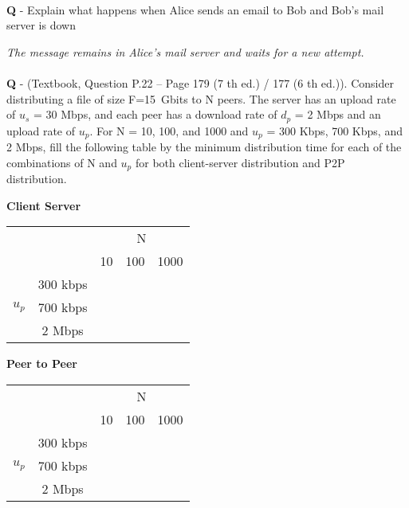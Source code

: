 \documentclass{llncs}
\newcounter{ques}
\newcommand{\quest}[2]{\paragraph{}\textbf{Q\theques} - #1\stepcounter{ques} }
\newcommand{\answer}[1]{\color{red}\textit{#1}\color{black}}
\begin{document}
\quest{Explain what happens when Alice sends an email to Bob and Bob's
  mail server is down}{10}

\answer{The message remains in Alice's mail server and waits for a new attempt.}

\quest{(Textbook, Question P.22 – Page 179 (7 th ed.) / 177 (6 th
  ed.)). Consider distributing a file of size F=15~Gbits to N
  peers. The server has an upload rate of $u_s$ = 30 Mbps, and each peer
  has a download rate of $d_p$ = 2 Mbps and an upload rate of $u_p$. For N =
  10, 100, and 1000 and $u_p$ = 300 Kbps, 700 Kbps, and 2 Mbps, fill the
  following table by the minimum distribution time for each of the
  combinations of N and $u_p$ for both client-server distribution and P2P
  distribution.

  \setlength{\tabcolsep}{25pt}
  
  \textbf{Client Server}\\

  \begin{tabular}{c|c|c|c|c}
     && \multicolumn{3}{c}{N} \\
    &           & 10 & 100 & 1000 \\
    \hline
      & 300 kbps &  \hfill  &  \hfill    & \hfill      \\
    \cline{2-5}
   $u_p$& 700 kbps &    &     &      \\
   \cline{2-5}
     & 2 Mbps   &    &     &   
  \end{tabular}


  \textbf{Peer to Peer}\\

  \begin{tabular}{c|c|c|c|c}
     && \multicolumn{3}{c}{N} \\
    &           & 10 & 100 & 1000 \\
    \hline
      & 300 kbps &  \hfill  &  \hfill    & \hfill      \\
    \cline{2-5}
   $u_p$& 700 kbps &    &     &      \\
   \cline{2-5}
     & 2 Mbps   &    &     &   
  \end{tabular}
  }{10}
\end{document}
